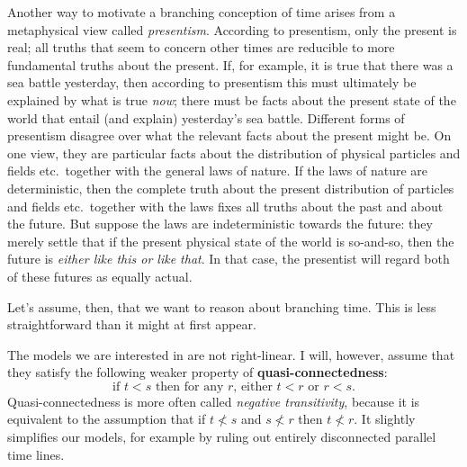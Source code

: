 Another way to motivate a branching conception of time arises from a
metaphysical view called \emph{presentism}. According to presentism, only the
present is real; all truths that seem to concern other times are reducible to
more fundamental truths about the present. If, for example, it is true that
there was a sea battle yesterday, then according to presentism this must
ultimately be explained by what is true \emph{now}; there must be facts about
the present state of the world that entail (and explain) yesterday's sea battle.
Different forms of presentism disagree over what the relevant facts about the
present might be. On one view, they are particular facts about the distribution
of physical particles and fields etc.\ together with the general laws of nature.
If the laws of nature are deterministic, then the complete truth about the
present distribution of particles and fields etc.\ together with the laws fixes
all truths about the past and about the future. But suppose the laws are
indeterministic towards the future: they merely settle that if the present
physical state of the world is so-and-so, then the future is \emph{either like
  this or like that}. In that case, the presentist will regard both of these
futures as equally actual.

Let's assume, then, that we want to reason about branching time. This is less
straightforward than it might at first appear.

The models we are interested in are not right-linear. I will, however, assume
that they satisfy the following weaker property of
\textbf{quasi-connectedness}:\label{quasiconnected}
\[
  \text{if $t < s$ then for any $r$, either $t < r$ or $r<s$}.
\]
Quasi-connectedness is more often called \emph{negative transitivity}, because
it is equivalent to the assumption that if $t \not< s$ and $s\not<r$ then
$t\not<r$. It slightly simplifies our models, for example by ruling out entirely
disconnected parallel time lines.

